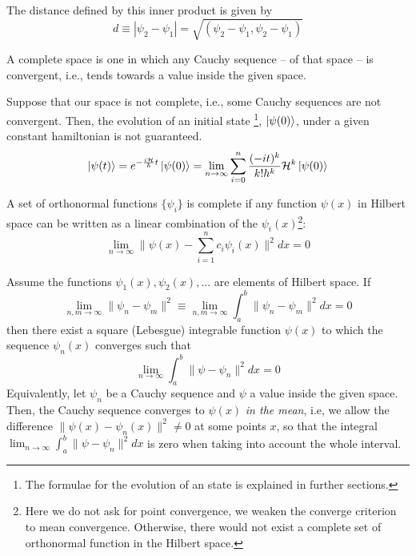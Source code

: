 \begin{definition}[Distance]
    The distance defined by this inner product is given by
    \begin{equation}
      d \equiv \left|\psi_{2} - \psi_{1}\right| = \sqrt{(\psi_{2}-\psi_{1},\psi_{2}-\psi_{1})}  
    \end{equation}
\end{definition}
\begin{definition}
A complete space is one in which any Cauchy sequence -- of that space -- is convergent, i.e., tends towards a value inside the given space.
\end{definition}
\begin{flushleft}
    Suppose that our space is not complete, i.e., some Cauchy sequences are not convergent. Then, the evolution of an initial state \footnote{The formulae for the evolution of an state is explained in further sections.}, $\ket{\psi(0)}$, under a given constant hamiltonian is not guaranteed.
    \begin{equation}
        \ket{\psi(t)} = e^{-\frac{i\mathcal{H}}{\hbar}t}\ket{\psi(0)} = \lim_{n \to \infty} \sum_{i = 0}^{n}\frac{(-it)^{k}}{k!h^{k}}\mathcal{H}^{k}\ket{\psi(0)}
    \end{equation}
    
\end{flushleft}
\begin{definition}
A set of orthonormal functions $\{\psi_{i}\}$ is complete if any function $\psi(x)$ in Hilbert space can be written as a linear combination of the $\psi_{i}(x)$\footnote{Here we do not ask for point convergence, we weaken the converge criterion to mean convergence. Otherwise, there would not exist a complete set of orthonormal function in the Hilbert space.}:
\begin{equation}
    \lim_{n\to \infty}\| \psi(x) - \sum_{i=1}^{n}c_{i}\psi_{i}(x)\|^{2}dx = 0
\end{equation}
\end{definition}
\begin{theorem}
Assume the functions $\psi_{1}(x),\psi_{2}(x),...$ are elements of Hilbert space. If
\begin{equation}
    \lim_{n,m\to\infty} \lVert \psi_{n} - \psi_{m}\rVert^{2} \equiv \lim_{n,m\to \infty} \int_{a}^{b} \|\psi_{n} - \psi_{m}\|^{2}dx = 0
\end{equation}
then there exist a square (Lebesgue) integrable function $\psi(x)$ to which the sequence $\psi_{n}(x)$ converges such that 
\begin{equation}
    \lim_{n\to \infty} \int_{a}^{b} \|\psi - \psi_{n}\|^{2}dx = 0
\end{equation}
Equivalently, let $\psi_{n}$ be a Cauchy sequence and $\psi$ a value inside the given space. Then, the Cauchy sequence converges to $\psi(x)$ \textit{in the mean}, i.e, we allow the difference $\|\psi(x) - \psi_{n}(x)\|^{2}\neq 0$ at some points $x$, so that the integral $\lim_{n\to \infty} \int_{a}^{b} \|\psi - \psi_{n}\|^{2}dx$ is zero when taking into account the whole interval.
\end{theorem}
